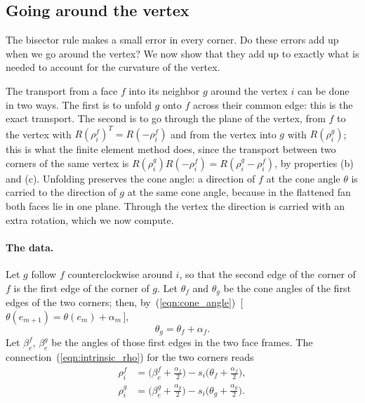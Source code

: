 \subsection{Going around the vertex}

The bisector rule makes a small error in every corner. Do these errors add up when we go around the vertex? We now show that they add up to exactly what is needed to account for the curvature of the vertex.

The transport from a face $f$ into its neighbor $g$ around the vertex $i$ can be done in two ways. The first is to unfold $g$ onto $f$ across their common edge: this is the exact transport. The second is to go through the plane of the vertex, from $f$ to the vertex with $R(\rho_i^f)^T = R(-\rho_i^f)$ and from the vertex into $g$ with $R(\rho_i^g)$; this is what the finite element method does, since the transport between two corners of the same vertex is $R(\rho_i^g)R(-\rho_i^f) = R(\rho_i^g - \rho_i^f)$, by properties (b) and (c). Unfolding preserves the cone angle: a direction of $f$ at the cone angle $\theta$ is carried to the direction of $g$ at the same cone angle, because in the flattened fan both faces lie in one plane. Through the vertex the direction is carried with an extra rotation, which we now compute.

\paragraph{The data.} Let $g$ follow $f$ counterclockwise around $i$, so that the second edge of the corner of $f$ is the first edge of the corner of $g$. Let $\theta_f$ and $\theta_g$ be the cone angles of the first edges of the two corners; then, by~(\ref{eqn:cone_angle})~[\,$\theta(e_{m+1}) = \theta(e_m) + \alpha_m$\,],
\begin{equation*}
\theta_g = \theta_f + \alpha_f .
\end{equation*}
Let $\beta_e^f$, $\beta_e^g$ be the angles of those first edges in the two face frames. The connection~(\ref{eqn:intrinsic_rho}) for the two corners reads
\begin{align*}
\rho_i^f &= \Big(\beta_e^f + \frac{\alpha_f}2\Big) - s_i\Big(\theta_f + \frac{\alpha_f}2\Big), \\
\rho_i^g &= \Big(\beta_e^g + \frac{\alpha_g}2\Big) - s_i\Big(\theta_g + \frac{\alpha_g}2\Big).
\end{align*}


